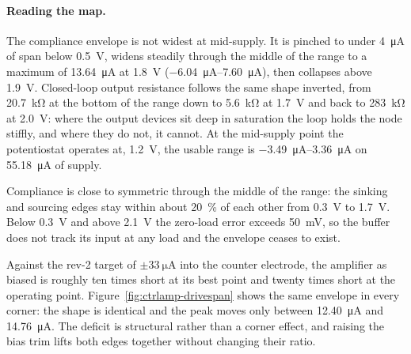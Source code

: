 %

\paragraph{Reading the map.}
The compliance envelope is not widest at mid-supply. It is pinched to under
\SI{4}{\micro\ampere} of span below \SI{0.5}{\volt}, widens steadily through the middle
of the range to a maximum of \SI{13.64}{\micro\ampere} at \SI{1.8}{\volt}
(\SIrange{-6.04}{7.60}{\micro\ampere}), then collapses above \SI{1.9}{\volt}. Closed-loop
output resistance follows the same shape inverted, from \SI{20.7}{\kilo\ohm} at the
bottom of the range down to \SI{5.6}{\kilo\ohm} at \SI{1.7}{\volt} and back to
\SI{283}{\kilo\ohm} at \SI{2.0}{\volt}: where the output devices sit deep in saturation
the loop holds the node stiffly, and where they do not, it cannot. At the mid-supply
point the potentiostat operates at, \SI{1.2}{\volt}, the usable range is
\SIrange{-3.49}{3.36}{\micro\ampere} on \SI{55.18}{\micro\ampere} of supply.

Compliance is close to symmetric through the middle of the range: the sinking and
sourcing edges stay within about \SI{20}{\percent} of each other from \SI{0.3}{\volt} to
\SI{1.7}{\volt}. Below \SI{0.3}{\volt} and above \SI{2.1}{\volt} the zero-load error
exceeds \SI{50}{\milli\volt}, so the buffer does not track its input at any load and the
envelope ceases to exist.

Against the rev-2 target of \(\pm\SI{33}{\micro\ampere}\) into the counter electrode, the
amplifier as biased is roughly ten times short at its best point and twenty times short
at the operating point. Figure~\ref{fig:ctrlamp-drivespan} shows the same envelope in
every corner: the shape is identical and the peak moves only between
\SI{12.40}{\micro\ampere} and \SI{14.76}{\micro\ampere}. The deficit is structural rather
than a corner effect, and raising the bias trim lifts both edges together without
changing their ratio.
